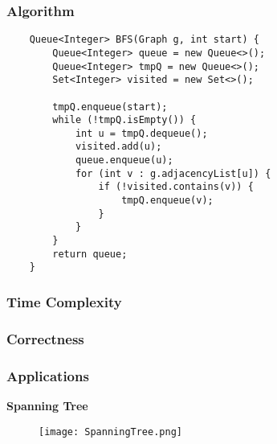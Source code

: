 \documentclass[10pt, 
a4paper, 
oneside, 
headinclude, footinclude, 
BCOR5mm]
{scrartcl}
\begin{document}
\subsubsection{Algorithm}
\begin{lstlisting}
    Queue<Integer> BFS(Graph g, int start) {
        Queue<Integer> queue = new Queue<>();
        Queue<Integer> tmpQ = new Queue<>();
        Set<Integer> visited = new Set<>();

        tmpQ.enqueue(start);
        while (!tmpQ.isEmpty()) {
            int u = tmpQ.dequeue();
            visited.add(u);
            queue.enqueue(u);
            for (int v : g.adjacencyList[u]) {
                if (!visited.contains(v)) {
                    tmpQ.enqueue(v);
                }
            }
        }
        return queue;
    }
\end{lstlisting}
\subsubsection{Time Complexity}
\subsubsection{Correctness}
\subsubsection{Applications}
\textbf{Spanning Tree}
\begin{figure}[H]
    \begin{center}
        \texttt{[image: SpanningTree.png]}
    \end{center}
\end{figure}
\newpage
\end{document}
